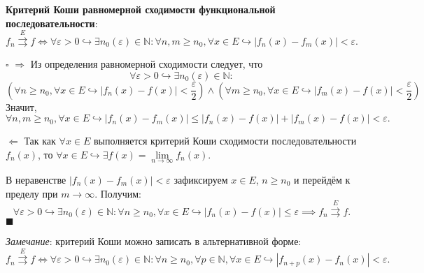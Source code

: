 \documentclass[12pt, a4paper, reqno]{article}
\begin{document}
    \textbf{Критерий Коши равномерной сходимости функциональной последовательности}:
    \begin{equation*}
        f_n \overset{E}{\rightrightarrows} f \iff
        \forall \varepsilon > 0 \hookrightarrow \exists n_0(\varepsilon) \in \mathbb{N}: \forall n, m \geq n_0,
        \forall x \in E \hookrightarrow |f_n(x) - f_m(x)| < \varepsilon.
    \end{equation*}

    $\square$
    $\boxed{\Rightarrow}$ Из определения равномерной сходимости следует, что
    \begin{equation*}
        \forall \varepsilon > 0 \hookrightarrow \exists n_0(\varepsilon) \in \mathbb{N}:
    \end{equation*}
    \begin{equation*}
        \left(\forall n \geq n_0, \forall x \in E \hookrightarrow
            |f_n(x) - f(x)| < \frac{\varepsilon}{2}\right) \wedge
        \left(\forall m \geq n_0, \forall x \in E \hookrightarrow
            |f_m(x) - f(x)| < \frac{\varepsilon}{2}\right)
    \end{equation*}
    Значит,
    \begin{equation*}
        \forall n, m \geq n_0, \forall x \in E \hookrightarrow |f_n(x) - f_m(x)| \leq
        |f_n(x) - f(x)| + |f_m(x) - f(x)| < \varepsilon.
    \end{equation*}

    $\boxed{\Leftarrow}$ Так как $\forall x \in E$ выполняется критерий Коши сходимости последовательности
    $f_n(x)$, то $\forall x \in E \hookrightarrow \exists f(x) = \lim\limits_{n \to \infty} f_n(x)$.

    В неравенстве $|f_n(x) - f_m(x)| < \varepsilon$ зафиксируем $x \in E$, $n \geq n_0$ и перейдём
    к пределу при $m \to \infty$. Получим:
    \begin{equation*}
        \forall \varepsilon > 0 \hookrightarrow \exists n_0(\varepsilon) \in \mathbb{N}: \forall n \geq n_0,
        \forall x \in E \hookrightarrow |f_n(x) - f(x)| \leq \varepsilon \implies
        f_n \overset{E}{\rightrightarrows} f.
    \end{equation*}
    $\blacksquare$

    \textit{Замечание}: критерий Коши можно записать в альтернативной форме:
    \begin{equation*}
        f_n \overset{E}{\rightrightarrows} f \iff
        \forall \varepsilon > 0 \hookrightarrow \exists n_0(\varepsilon) \in \mathbb{N}: \forall n \geq n_0,
        \forall p \in \mathbb{N}, \forall x \in E \hookrightarrow |f_{n + p}(x) - f_n(x)| < \varepsilon.
    \end{equation*}
\end{document}

